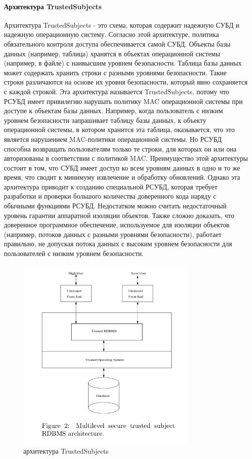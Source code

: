 \paragraph{Архитектура TrustedSubjects}
Архитектура TrustedSubjects - это схема, которая содержит надежную СУБД и надежную операционную систему.
Согласно этой архитектуре, политика обязательного контроля доступа обеспечивается самой СУБД.
Объекты базы данных (например, таблица) хранятся в объектах операционной системы (например, в файле) с наивысшим
уровнем безопасности. Таблица базы данных может содержать хранить строки с разными уровнями безопасности.
Такие строки различаются на основе их уровня безопасности, который явно сохраняется с каждой строкой.
Эта архитектура называется TrustedSubjects, потому что РСУБД имеет привилегию нарушать политику MAC
операционной системы при доступе к объектам базы данных. Например, когда пользователь с низким уровнем
безопасности запрашивает таблицу базы данных, к объекту операционной системы, в котором хранится эта таблица,
оказывается, что это является нарушением MAC-политики операционной системы. Но РСУБД способна возвращать пользователям
только те строки, для которых он или она авторизованы в соответствии с политикой MAC.
Преимущество этой архитектуры состоит в том, что СУБД имеет доступ ко всем уровням данных в одно и то же время,
что сводит к минимуму извлечение и обработку обновлений. Однако эта архитектура приводит к созданию специальной
РСУБД, которая требует разработки и проверки большого количества доверенного кода наряду с обычными функциями РСУБД.
Недостатком можно считать недостаточный уровень гарантии аппаратной изоляции объектов.
Также сложно доказать, что доверенное программное обеспечение, используемое для изоляции объектов
(например, потоков данных с разными уровнями безопасности), работает правильно, не допуская потока данных
с высоким уровнем безопасности для пользователей с низким уровнем безопасности.
\begin{figure}[H]
    \centering
    \includegraphics[width=0.8\textwidth]{assets/security/trusted.png}
    \caption{архитектура TrustedSubjects}
    \label{fig:mesh02}
\end{figure}

